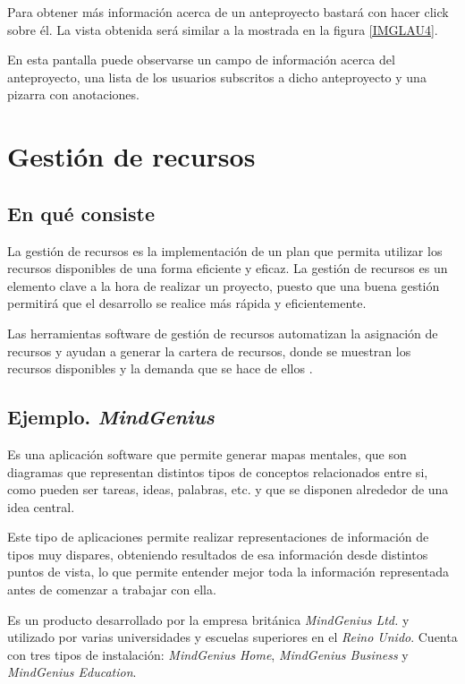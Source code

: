 \documentclass[11pt,a4paper,spanish,twoside]{report}
\begin{document}
	Para obtener más información acerca de un anteproyecto bastará con hacer
	click sobre él. La vista obtenida será similar a la mostrada en la figura
	\ref{IMGLAU4}.
		

	En esta pantalla puede observarse un campo de información acerca del
	anteproyecto, una lista de los usuarios subscritos a dicho anteproyecto y
	una pizarra con anotaciones.

\chapter{Gestión de recursos}
\section{En qué consiste}
La gestión de recursos es la implementación de un plan que permita utilizar
los recursos disponibles de una forma eficiente y eficaz. La gestión de
recursos es un elemento clave a la hora de realizar un proyecto, puesto que
una buena gestión permitirá que el desarrollo se realice más rápida y
eficientemente.

Las herramientas software de gestión de recursos automatizan la asignación de
recursos y ayudan a generar la cartera de recursos, donde se muestran los
recursos disponibles y la demanda que se hace de ellos \cite{WRS}.

\section{Ejemplo. \emph{MindGenius}}
Es una aplicación software que permite generar mapas mentales, que son
diagramas que representan distintos tipos de conceptos relacionados entre si,
como pueden ser tareas, ideas, palabras, etc. y que se disponen alrededor de
una idea central.

Este tipo de aplicaciones permite realizar representaciones de información de
tipos muy dispares, obteniendo resultados de esa información desde distintos
puntos de vista, lo que permite entender mejor toda la información
representada antes de comenzar a trabajar con ella.

Es un producto desarrollado por la empresa británica \emph{MindGenius Ltd.} y
utilizado por varias universidades y escuelas superiores en el \emph{Reino
  Unido}. Cuenta con tres tipos de instalación: \emph{MindGenius Home},
\emph{MindGenius Business} y \emph{MindGenius Education}. 
\end{document}
